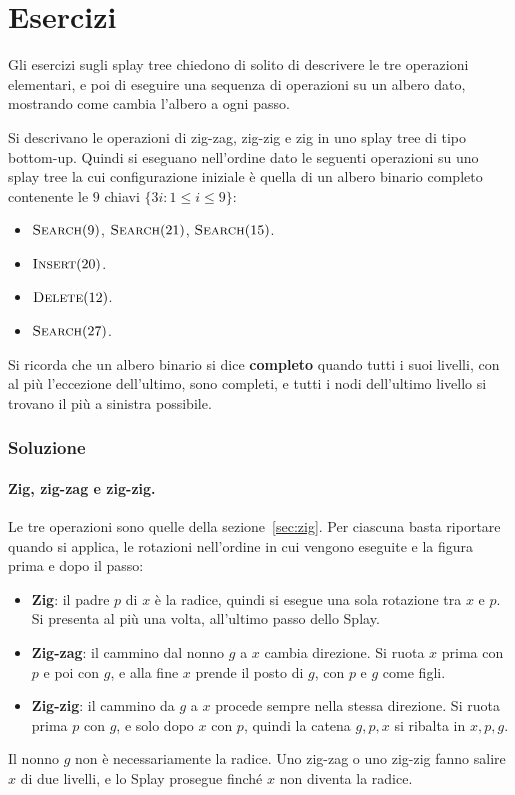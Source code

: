 \section{Esercizi}\label{sec:splay-esercizi}
Gli esercizi sugli splay tree chiedono di solito di descrivere le tre operazioni elementari, e poi di eseguire una sequenza di operazioni su un albero dato, mostrando come cambia l'albero a ogni passo.

\begin{esercizio}\label{es:splay-completo}
Si descrivano le operazioni di zig-zag, zig-zig e zig in uno splay tree di tipo bottom-up. Quindi si eseguano nell'ordine dato le seguenti operazioni su uno splay tree la cui configurazione iniziale è quella di un albero binario completo contenente le $9$ chiavi $\{3i : 1 \le i \le 9\}$:
\begin{itemize}
    \item $\textsc{Search}(9)$, $\textsc{Search}(21)$, $\textsc{Search}(15)$.
    \item $\textsc{Insert}(20)$.
    \item $\textsc{Delete}(12)$.
    \item $\textsc{Search}(27)$.
\end{itemize}
Si ricorda che un albero binario si dice \textbf{completo} quando tutti i suoi livelli, con al più l'eccezione dell'ultimo, sono completi, e tutti i nodi dell'ultimo livello si trovano il più a sinistra possibile.
\end{esercizio}

\subsubsection*{Soluzione}

\paragraph{Zig, zig-zag e zig-zig.}
Le tre operazioni sono quelle della sezione~\ref{sec:zig}. Per ciascuna basta riportare quando si applica, le rotazioni nell'ordine in cui vengono eseguite e la figura prima e dopo il passo:
\begin{itemize}
    \item \textbf{Zig}: il padre $p$ di $x$ è la radice, quindi si esegue una sola rotazione tra $x$ e $p$. Si presenta al più una volta, all'ultimo passo dello Splay.
    \item \textbf{Zig-zag}: il cammino dal nonno $g$ a $x$ cambia direzione. Si ruota $x$ prima con $p$ e poi con $g$, e alla fine $x$ prende il posto di $g$, con $p$ e $g$ come figli.
    \item \textbf{Zig-zig}: il cammino da $g$ a $x$ procede sempre nella stessa direzione. Si ruota prima $p$ con $g$, e solo dopo $x$ con $p$, quindi la catena $g, p, x$ si ribalta in $x, p, g$.
\end{itemize}
Il nonno $g$ non è necessariamente la radice. Uno zig-zag o uno zig-zig fanno salire $x$ di due livelli, e lo Splay prosegue finché $x$ non diventa la radice.

